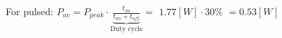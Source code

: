 \documentclass[preview]{standalone}
\begin{document}
\begin{center}
For pulsed: $P_{av} = P_{peak} \cdot \underbrace{\frac{t_{on}}{t_{on}+t_{off}}}_{\text{Duty cycle}}=$ $1.77 [W] \cdot 30 \%$ $= 0.53 [W]$
\end{center}
\end{document}
